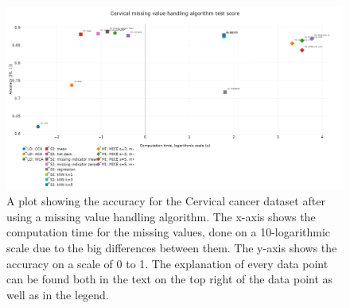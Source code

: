 \documentclass[10pt,a4paper]{article}
\begin{document}
	\begin{figure}[H]
		\centering
		\includegraphics[angle=90,height=0.9\textheight]{cerv_acc.PNG}
		\caption{A plot showing the accuracy for the Cervical cancer dataset after using a missing value handling algorithm. The x-axis shows the computation time for the missing values, done on a 10-logarithmic scale due to the big differences between them. The y-axis shows the accuracy on a scale of 0 to 1. The explanation of every data point can be found both in the text on the top right of the data point as well as in the legend.}
		\label{fig:EvalCervhAcc}
	\end{figure}
\end{document}
